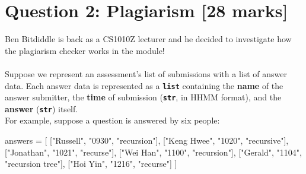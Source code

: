 \section{Question 2: Plagiarism [28 marks]}
Ben Bitdiddle is back as a CS1010Z lecturer and he decided to investigate how the plagiarism checker works in the module! \\ \\
Suppose we represent an assessment's list of submissions with a list of answer data. Each answer data is represented as a 
\colorbox{CornflowerBlue!20}{\texttt{\textbf{list}}} containing the \textbf{name} of the answer submitter, the \textbf{time} of 
submission (\colorbox{CornflowerBlue!20}{\texttt{\textbf{str}}}, in HHMM format), and the \textbf{answer} (\colorbox{CornflowerBlue!20}{\texttt{\textbf{str}}}) itself. \\
For example, suppose a question is answered by six people:
\begin{python}
answers = [
    ["Russell", "0930", "recursion"], ["Keng Hwee", "1020", "recursive"],
    ["Jonathan", "1021", "recurse"], ["Wei Han", "1100", "recursion"],
    ["Gerald", "1104", "recursion tree"], ["Hoi Yin", "1216", "recurse"]
]
\end{python}
